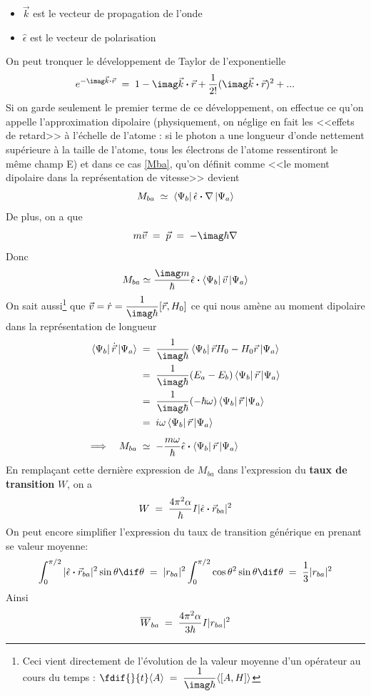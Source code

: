 \begin{itemize}[label=$\bullet$]
    \item $\vec{k}$ est le vecteur de propagation de l'onde
    \item $\hat{\epsilon}$ est le vecteur de polarisation
\end{itemize}
On peut tronquer le développement de Taylor de l'exponentielle
\begin{equation}
    e^{-\imag\vec{k}\Cdot\vec{r}}\eq 1-\imag\vec{k}\Cdot\vec{r}+\dfrac{1}{2!}(\imag\vec{k}\Cdot\vec{r})^2+...
    \label{eq:dvpl_expo}
\end{equation}
Si on garde seulement le premier terme de ce développement, on effectue ce qu'on appelle l'approximation dipolaire (physiquement, on néglige en fait les <<effets de retard>> à l'échelle de l'atome : si le photon a une longueur d'onde nettement supérieure à la taille de l'atome, tous les électrons de l'atome ressentiront le même champ E) et dans ce cas \eqref{Mba}, qu'on définit comme <<le moment dipolaire dans la représentation de vitesse>> devient
\[
    M_{ba} \;\simeq\; \bra{\Psi_b}\hat{\epsilon}\boldsymbol{\cdot}\nabla\ket{\Psi_a}
\]
De plus, on a que
\[
    m\vec{v}\eq \vec{p}\eq -\imag\hbar \nabla
\]
Donc
\[
    M_{ba} \simeq \dfrac{\imag m}{\hbar}\hat{\epsilon}\Cdot\bra{\Psi_b}\vec{v}\ket{\Psi_a}
\]
On sait aussi\footnote{Ceci vient directement de l'évolution de la valeur moyenne d'un opérateur au cours du temps : $\fdif{}{t}\langle A \rangle \eq \dfrac{1}{\imag\hbar}\langle[A,H] \rangle$} que $\vec{v}=\dot{r}=\dfrac{1}{\imag\hbar}[\vec{r},H_0]$ ce qui nous amène au moment dipolaire dans la représentation de longueur
\begin{align*}
    \bra{\Psi_b}\dot{\vec{r}}\ket{\Psi_a}
    &\eq
    \dfrac{1}{\imag\hbar}\bra{\Psi_b}\vec{r}H_0-H_0\vec{r}\ket{\Psi_a}\\
    &\eq
    \dfrac{1}{\imag\hbar}(E_a-E_b)\bra{\Psi_b}\vec{r}\ket{\Psi_a}\\
    &\eq
    \dfrac{1}{\imag\hbar}(-\hbar \omega)\bra{\Psi_b}\vec{r}\ket{\Psi_a} \\
    &\eq
    i \omega \bra{\Psi_b}\vec{r}\ket{\Psi_a} \\[5pt]
    \Longrightarrow \quad M_{ba} &\;\simeq\;
    -\dfrac{m \omega}{\hbar}\hat{\epsilon}\Cdot\bra{\Psi_b}\vec{r}\ket{\Psi_a}
\end{align*}
En remplaçant cette dernière expression de $M_{ba}$ dans l'expression du \textbf{taux de transition} $W$, on a
\[
    W\; = \; \dfrac{4\pi^2 \alpha}{\hbar}I |\hat{\epsilon}\boldsymbol{\cdot}\vec{r}_{ba}|^2
\]
On peut encore simplifier l'expression du taux de transition générique en prenant se valeur moyenne:
\[
    \int_{0}^{\pi/2} |\hat{\epsilon}\Cdot\vec{r}_{ba}|^2\sin{\theta} \dif\theta\eq |r_{ba}|^2\int_{0}^{\pi/2}\cos{\theta}^2\sin{\theta}\dif\theta\eq \dfrac{1}{3}|r_{ba}|^2
\]
Ainsi
\begin{equation}
    \overline{W}_{ba}\; = \; \dfrac{4\pi^2 \alpha}{3 \hbar}I |r_{ba}|^2
\end{equation}



